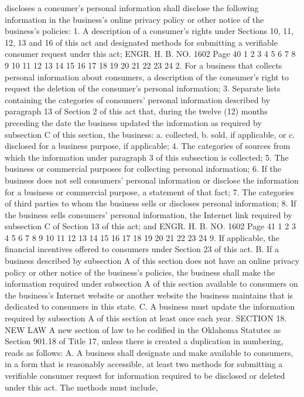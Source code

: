 discloses a consumer's personal information shall disclose the
following information in the business's online privacy policy or
other notice of the business's policies:
1. A description of a consumer's rights under Sections 10, 11,
12, 13 and 16 of this act and designated methods for submitting a
verifiable consumer request under this act;
ENGR. H. B. NO. 1602 Page 40
1
2
3
4
5
6
7
8
9
10
11
12
13
14
15
16
17
18
19
20
21
22
23
24
2. For a business that collects personal information about
consumers, a description of the consumer's right to request the
deletion of the consumer's personal information;
3. Separate lists containing the categories of consumers'
personal information described by paragraph 13 of Section 2 of this
act that, during the twelve (12) months preceding the date the
business updated the information as required by subsection C of this
section, the business:
a. collected,
b. sold, if applicable, or
c. disclosed for a business purpose, if applicable;
4. The categories of sources from which the information under
paragraph 3 of this subsection is collected;
5. The business or commercial purposes for collecting personal
information;
6. If the business does not sell consumers' personal
information or disclose the information for a business or commercial
purpose, a statement of that fact;
7. The categories of third parties to whom the business sells
or discloses personal information;
8. If the business sells consumers' personal information, the
Internet link required by subsection C of Section 13 of this act;
and
ENGR. H. B. NO. 1602 Page 41
1
2
3
4
5
6
7
8
9
10
11
12
13
14
15
16
17
18
19
20
21
22
23
24
9. If applicable, the financial incentives offered to consumers
under Section 23 of this act.
B. If a business described by subsection A of this section does
not have an online privacy policy or other notice of the business's
policies, the business shall make the information required under
subsection A of this section available to consumers on the
business's Internet website or another website the business
maintains that is dedicated to consumers in this state.
C. A business must update the information required by
subsection A of this section at least once each year.
SECTION 18. NEW LAW A new section of law to be codified
in the Oklahoma Statutes as Section 901.18 of Title 17, unless there
is created a duplication in numbering, reads as follows:
A. A business shall designate and make available to consumers,
in a form that is reasonably accessible, at least two methods for
submitting a verifiable consumer request for information required to
be disclosed or deleted under this act. The methods must include,

